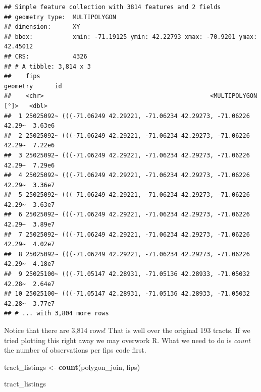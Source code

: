 \documentclass[
]{book}
\newenvironment{Shaded}{\begin{snugshade}}{\end{snugshade}}
\newcommand{\KeywordTok}[1]{\textcolor[rgb]{0.13,0.29,0.53}{\textbf{#1}}}
\newcommand{\NormalTok}[1]{#1}
\newcommand{\StringTok}[1]{\textcolor[rgb]{0.31,0.60,0.02}{#1}}
\begin{document}
\begin{verbatim}
## Simple feature collection with 3814 features and 2 fields
## geometry type:  MULTIPOLYGON
## dimension:      XY
## bbox:           xmin: -71.19125 ymin: 42.22793 xmax: -70.9201 ymax: 42.45012
## CRS:            4326
## # A tibble: 3,814 x 3
##    fips                                                         geometry      id
##    <chr>                                              <MULTIPOLYGON [°]>   <dbl>
##  1 25025092~ (((-71.06249 42.29221, -71.06234 42.29273, -71.06226 42.29~  3.63e6
##  2 25025092~ (((-71.06249 42.29221, -71.06234 42.29273, -71.06226 42.29~  7.22e6
##  3 25025092~ (((-71.06249 42.29221, -71.06234 42.29273, -71.06226 42.29~  7.29e6
##  4 25025092~ (((-71.06249 42.29221, -71.06234 42.29273, -71.06226 42.29~  3.36e7
##  5 25025092~ (((-71.06249 42.29221, -71.06234 42.29273, -71.06226 42.29~  3.63e7
##  6 25025092~ (((-71.06249 42.29221, -71.06234 42.29273, -71.06226 42.29~  3.89e7
##  7 25025092~ (((-71.06249 42.29221, -71.06234 42.29273, -71.06226 42.29~  4.02e7
##  8 25025092~ (((-71.06249 42.29221, -71.06234 42.29273, -71.06226 42.29~  4.18e7
##  9 25025100~ (((-71.05147 42.28931, -71.05136 42.28933, -71.05032 42.28~  2.64e7
## 10 25025100~ (((-71.05147 42.28931, -71.05136 42.28933, -71.05032 42.28~  3.77e7
## # ... with 3,804 more rows
\end{verbatim}

Notice that there are 3,814 rows! That is well over the original 193 tracts. If we tried plotting this right away we may overwork R. What we need to do is \emph{count} the number of observations per fips code first.

\begin{Shaded}
\begin{Highlighting}[]
\NormalTok{tract\_listings \textless{}{-}}\StringTok{ }\KeywordTok{count}\NormalTok{(polygon\_join, fips)}

\NormalTok{tract\_listings}
\end{Highlighting}
\end{Shaded}
\end{document}
